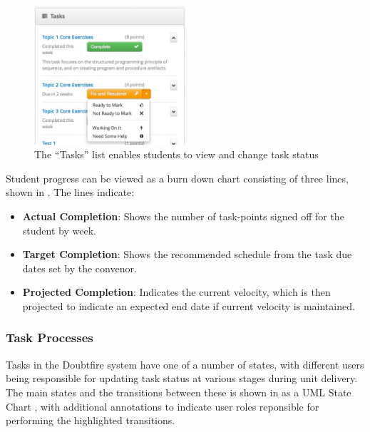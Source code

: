 \begin{figure}[thbp]
  \centering
  \includegraphics[width=0.5\textwidth]{StudentTasks}
  \caption{The ``Tasks'' list enables students to view and change task status}
  \label{fig:task_list}
\end{figure}

Student progress can be viewed as a burn down chart consisting of three lines, shown in . The lines indicate:
\begin{itemize}[noitemsep,nolistsep]
  \item \textbf{Actual Completion}: Shows the number of task-points signed off for the student by week.
  \item \textbf{Target Completion}: Shows the recommended schedule from the task due dates set by the convenor.
  \item \textbf{Projected Completion}: Indicates the current velocity, which is then projected to indicate an expected end date if current velocity is maintained.
\end{itemize}


\subsubsection{Task Processes} %
\label{sub:task_processes}

Tasks in the Doubtfire system have one of a number of states, with different users being responsible for updating task status at various stages during unit delivery. The main states and the transitions between these is shown in  as a UML State Chart \cite{OMG:2011}, with additional annotations to indicate user roles reponsible for performing the highlighted transitions. 

